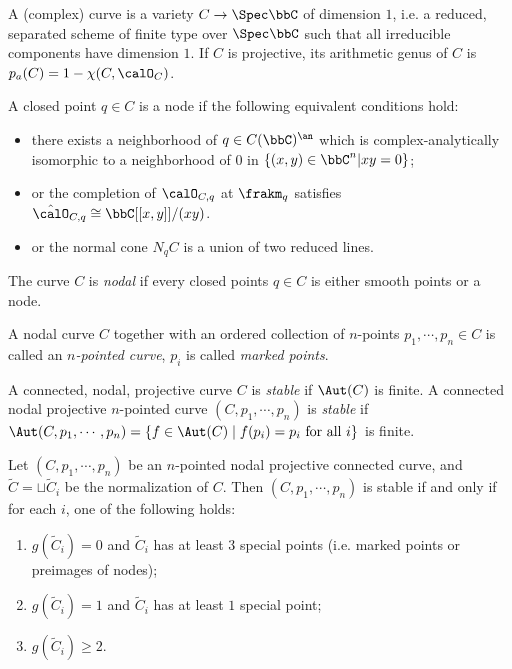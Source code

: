     A (complex) curve is a variety $C \to \Spec \bbC$ of dimension $1$, i.e. a reduced, separated scheme of finite type over $\Spec \bbC$ such that all irreducible components have dimension $1$.
    If $C$ is projective, its arithmetic genus of $C$ is $p_a(C) = 1- \chi(C,\calO_C)$.

    \begin{definition} 
        A closed point $q \in C$ is a node if the following equivalent conditions hold:
        \begin{itemize}
            \item there exists a neighborhood of $q \in C(\bbC)^\an$ which is complex-analytically isomorphic to a neighborhood of $0$ in $\{(x,y) \in \bbC^n | xy = 0\}$;
            \item or the completion of $\calO_{C,q}$ at $\frakm_q$ satisfies $\hat{\calO}_{C,q} \cong \bbC[[x,y]]/(xy)$.
            \item or the normal cone $N_q C$ is a union of two reduced lines.
        \end{itemize}
        The curve $C$ is \emph{nodal} if every closed points $q \in C$ is either smooth points or a node.
    \end{definition}
   
    \begin{definition}
        A nodal curve $C$ together with an ordered collection of $n$-points $p_1,\cdots,p_n \in C$ is called an \emph{$n$-pointed curve}, $p_i$ is called \emph{marked points}.
    \end{definition}

    \begin{definition}
        A connected, nodal, projective curve $C$ is \emph{stable} if $\Aut(C)$ is finite.
        A connected nodal projective $n$-pointed curve $(C,p_1,\cdots,p_n)$ is \emph{stable} if $\Aut(C,p_1,\cdots,p_n) = \{f \in \Aut(C) \mid f(p_i) = p_i \text{ for all } i\}$ is finite.
    \end{definition}
    
    \begin{proposition}
        Let $(C,p_1,\cdots,p_n)$ be an $n$-pointed nodal projective connected curve, and $\tilde{C} = \sqcup \tilde{C}_i$ be the normalization of $C$.
        Then $(C,p_1,\cdots,p_n)$ is stable if and only if for each $i$, one of the following holds:
        \begin{enumerate}
            \item $g(\tilde{C}_i) = 0$ and $\tilde{C}_i$ has at least $3$ special points (i.e. marked points or preimages of nodes);
            \item $g(\tilde{C}_i) = 1$ and $\tilde{C}_i$ has at least $1$ special point;
            \item $g(\tilde{C}_i) \ge 2$.
        \end{enumerate}
    \end{proposition}

